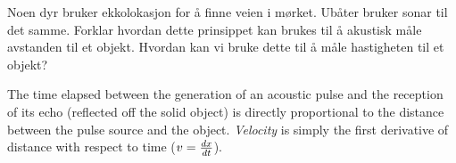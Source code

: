 

Noen dyr bruker ekkolokasjon for å finne veien i mørket. Ubåter bruker sonar til det samme. Forklar hvordan dette prinsippet kan brukes til å akustisk måle avstanden til et objekt. Hvordan kan vi bruke dette til å måle hastigheten til et objekt?







The time elapsed between the generation of an acoustic pulse and the reception of its echo (reflected off the solid object) is directly proportional to the distance between the pulse source and the object.  {\it Velocity} is simply the first derivative of distance with respect to time ($v = {dx \over dt}$).











